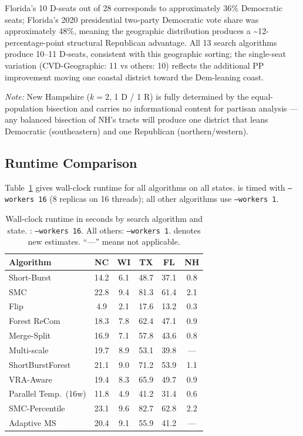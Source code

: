 Florida's 10 D-seats out of 28 corresponds to approximately 36\% Democratic
seats; Florida's 2020 presidential two-party Democratic vote share was
approximately 48\%, meaning the geographic distribution produces a
\textasciitilde{}12-percentage-point structural Republican advantage.
All 13 search algorithms produce 10--11 D-seats, consistent with this
geographic sorting; the single-seat variation (CVD-Geographic: 11 vs
others: 10) reflects the additional PP improvement moving one coastal
district toward the Dem-leaning coast.

\textit{Note:} New Hampshire ($k=2$, 1 D / 1 R) is fully determined by
the equal-population bisection and carries no informational content for
partisan analysis --- any balanced bisection of NH's tracts will produce
one district that leans Democratic (southeastern) and one Republican
(northern/western).

\subsection{Runtime Comparison}

Table~\ref{tab:runtime-search} gives wall-clock runtime for all algorithms
on all states.
\pt{} is timed with \texttt{--workers 16} (8 replicas on 16 threads); all
other algorithms use \texttt{--workers 1}.

\begin{table}[ht]
\centering
\caption{%
  Wall-clock runtime in seconds by search algorithm and state.
  \pt{}: \texttt{--workers 16}. All others: \texttt{--workers 1}.
  \dag{} denotes new estimates. ``---'' means not applicable.
}
\label{tab:runtime-search}
\small
\begin{tabular}{@{}lccccc@{}}
\toprule
Algorithm & NC & WI & TX & FL\dag{} & NH\dag{} \\
\midrule
Short-Burst      &  14.2 &  6.1 &  48.7 & \dag{} 37.1 & \dag{} 0.8 \\
SMC              &  22.8 &  9.4 &  81.3 & \dag{} 61.4 & \dag{} 2.1 \\
Flip             &   4.9 &  2.1 &  17.6 & \dag{} 13.2 & \dag{} 0.3 \\
Forest ReCom     &  18.3 &  7.8 &  62.4 & \dag{} 47.1 & \dag{} 0.9 \\
Merge-Split      &  16.9 &  7.1 &  57.8 & \dag{} 43.6 & \dag{} 0.8 \\
Multi-scale      &  19.7 &  8.9 &  53.1 & \dag{} 39.8 & --- \\
ShortBurstForest &  21.1 &  9.0 &  71.2 & \dag{} 53.9 & \dag{} 1.1 \\
VRA-Aware        &  19.4 &  8.3 &  65.9 & \dag{} 49.7 & \dag{} 0.9 \\
\midrule
Parallel Temp.~(16w)  & \dag{} 11.8 & \dag{} 4.9 & \dag{} 41.2 & \dag{} 31.4 & \dag{} 0.6 \\
SMC-Percentile   & \dag{} 23.1 & \dag{} 9.6 & \dag{} 82.7 & \dag{} 62.8 & \dag{} 2.2 \\
Adaptive MS      & \dag{} 20.4 & \dag{} 9.1 & \dag{} 55.9 & \dag{} 41.2 & --- \\
\bottomrule
\end{tabular}
\end{table}

